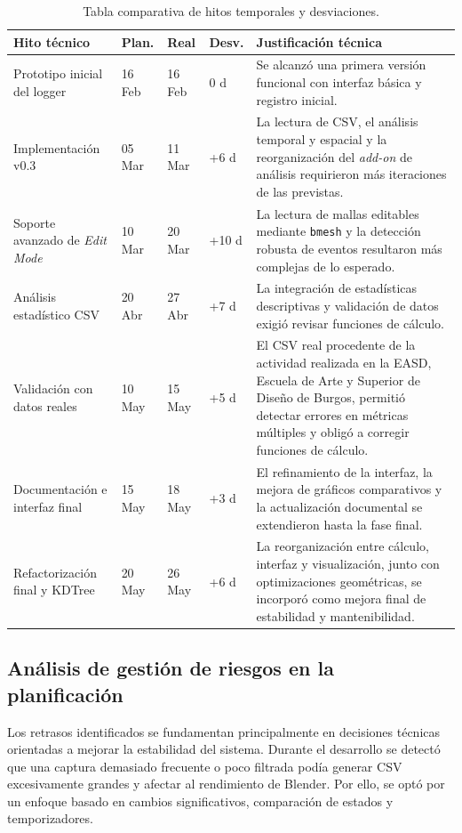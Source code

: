 \begin{table}[H]
\centering
\scriptsize
\renewcommand{\arraystretch}{1.2}
\begin{tabularx}{\textwidth}{p{3.3cm}p{1.8cm}p{1.8cm}p{1.6cm}X}
\toprule
\textbf{Hito técnico} & \textbf{Plan.} & \textbf{Real} & \textbf{Desv.} & \textbf{Justificación técnica} \\
\midrule
Prototipo inicial del logger & 16 Feb & 16 Feb & 0 d & Se alcanzó una primera versión funcional con interfaz básica y registro inicial. \\
Implementación v0.3 & 05 Mar & 11 Mar & +6 d & La lectura de CSV, el análisis temporal y espacial y la reorganización del \textit{add-on} de análisis requirieron más iteraciones de las previstas. \\
Soporte avanzado de \textit{Edit Mode} & 10 Mar & 20 Mar & +10 d & La lectura de mallas editables mediante \texttt{bmesh} y la detección robusta de eventos resultaron más complejas de lo esperado. \\
Análisis estadístico CSV & 20 Abr & 27 Abr & +7 d & La integración de estadísticas descriptivas y validación de datos exigió revisar funciones de cálculo. \\
Validación con datos reales & 10 May & 15 May & +5 d & El CSV real procedente de la actividad realizada en la EASD, Escuela de Arte y Superior de Diseño de Burgos, permitió detectar errores en métricas múltiples y obligó a corregir funciones de cálculo. \\
Documentación e interfaz final & 15 May & 18 May & +3 d & El refinamiento de la interfaz, la mejora de gráficos comparativos y la actualización documental se extendieron hasta la fase final. \\
Refactorización final y KDTree & 20 May & 26 May & +6 d & La reorganización entre cálculo, interfaz y visualización, junto con optimizaciones geométricas, se incorporó como mejora final de estabilidad y mantenibilidad. \\
\bottomrule
\end{tabularx}
\caption{Tabla comparativa de hitos temporales y desviaciones.}
\label{tab:desviaciones}
\end{table}

\subsection{Análisis de gestión de riesgos en la planificación}
\label{subsec:a-riesgos-planificacion}

Los retrasos identificados se fundamentan principalmente en decisiones técnicas orientadas a mejorar la estabilidad del sistema. Durante el desarrollo se detectó que una captura demasiado frecuente o poco filtrada podía generar CSV excesivamente grandes y afectar al rendimiento de Blender. Por ello, se optó por un enfoque basado en cambios significativos, comparación de estados y temporizadores.

